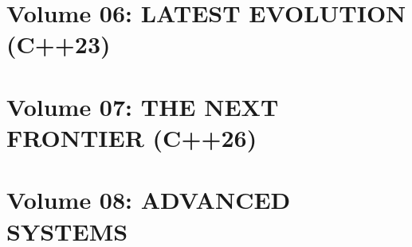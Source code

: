 \documentclass[11pt, a4paper, openany]{book}
\begin{document}
\part{Volume 06: LATEST EVOLUTION (C++23)}






\part{Volume 07: THE NEXT FRONTIER (C++26)}

\part{Volume 08: ADVANCED SYSTEMS}










\end{document}

